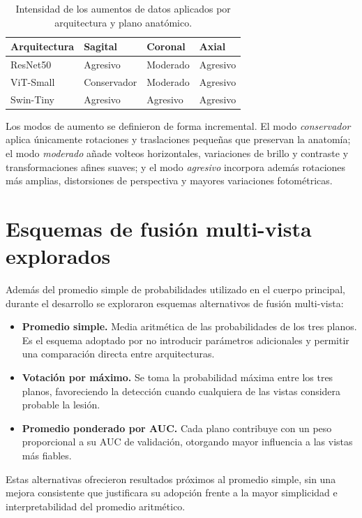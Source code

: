 \begin{table}[H]
\centering
\small
\caption{Intensidad de los aumentos de datos aplicados por arquitectura y plano anatómico.}
\label{tab:augmentation}
\begin{tabularx}{\textwidth}{
>{\raggedright\arraybackslash}X
>{\centering\arraybackslash}m{2.6cm}
>{\centering\arraybackslash}m{2.6cm}
>{\centering\arraybackslash}m{2.6cm}
}
\toprule
\textbf{Arquitectura} &
\textbf{Sagital} &
\textbf{Coronal} &
\textbf{Axial} \\
\midrule
ResNet50   & Agresivo      & Moderado & Agresivo \\
ViT-Small  & Conservador   & Moderado & Agresivo \\
Swin-Tiny  & Agresivo      & Agresivo & Agresivo \\
\bottomrule
\end{tabularx}
\end{table}

Los modos de aumento se definieron de forma incremental. El modo \textit{conservador} aplica únicamente rotaciones y traslaciones pequeñas que preservan la anatomía; el modo \textit{moderado} añade volteos horizontales, variaciones de brillo y contraste y transformaciones afines suaves; y el modo \textit{agresivo} incorpora además rotaciones más amplias, distorsiones de perspectiva y mayores variaciones fotométricas.

\section{Esquemas de fusión multi-vista explorados}

Además del promedio simple de probabilidades utilizado en el cuerpo principal, durante el desarrollo se exploraron esquemas alternativos de fusión multi-vista:

\begin{itemize}
    \item \textbf{Promedio simple.} Media aritmética de las probabilidades de los tres planos. Es el esquema adoptado por no introducir parámetros adicionales y permitir una comparación directa entre arquitecturas.
    \item \textbf{Votación por máximo.} Se toma la probabilidad máxima entre los tres planos, favoreciendo la detección cuando cualquiera de las vistas considera probable la lesión.
    \item \textbf{Promedio ponderado por AUC.} Cada plano contribuye con un peso proporcional a su AUC de validación, otorgando mayor influencia a las vistas más fiables.
\end{itemize}

Estas alternativas ofrecieron resultados próximos al promedio simple, sin una mejora consistente que justificara su adopción frente a la mayor simplicidad e interpretabilidad del promedio aritmético.

